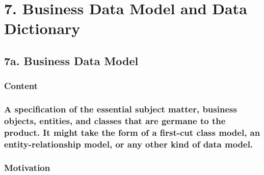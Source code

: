 \documentclass[
]{article}
\begin{document}
\hypertarget{section-7}{%
\subsubsection{}\label{section-7}}

\hypertarget{business-data-model-and-data-dictionary}{%
\section{\texorpdfstring{7. Business Data Model and Data Dictionary
}{7. Business Data Model and Data Dictionary }}\label{business-data-model-and-data-dictionary}}

\hypertarget{a.-business-data-model}{%
\subsection{7a. Business Data Model}\label{a.-business-data-model}}

\hypertarget{content-26}{%
\subsubsection{Content}\label{content-26}}

\hypertarget{a-specification-of-the-essential-subject-matter-business-objects-entities-and-classes-that-are-germane-to-the-product.-it-might-take-the-form-of-a-first-cut-class-model-an-entity-relationship-model-or-any-other-kind-of-data-model.}{%
\subsubsection{\texorpdfstring{A specification of the essential subject
matter, business objects, entities, and classes that are germane to the
product. It might take the form of a first-cut class model, an
entity-relationship model, or any other kind of data model.
}{A specification of the essential subject matter, business objects, entities, and classes that are germane to the product. It might take the form of a first-cut class model, an entity-relationship model, or any other kind of data model. }}\label{a-specification-of-the-essential-subject-matter-business-objects-entities-and-classes-that-are-germane-to-the-product.-it-might-take-the-form-of-a-first-cut-class-model-an-entity-relationship-model-or-any-other-kind-of-data-model.}}

\hypertarget{motivation-26}{%
\subsubsection{Motivation}\label{motivation-26}}
\end{document}
